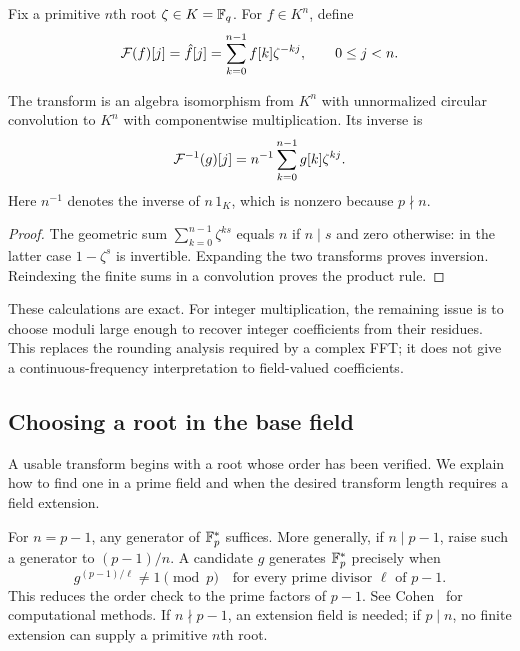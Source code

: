 \begin{defn}
Fix a primitive $n$th root $\zeta\in K=\mathbb{F}_q$. For $f\in K^n$, define
\begin{equation}
\label{eq-defn-transforme-fp}
 \mathcal{F}(f)[j]=\hat{f}[j]=\sum_{k=0}^{n-1}f[k]\zeta^{-kj},\qquad 0\leq j<n.
\end{equation}
\end{defn}


\begin{prop}
\label{prop-prtes-tfd-finite-field}
The transform is an algebra isomorphism from $K^n$ with unnormalized
circular convolution to $K^n$ with componentwise multiplication. Its
inverse is
\begin{equation}
\label{eq-defn-tfd-finite-field}
 \mathcal{F}^{-1}(g)[j]=n^{-1}\sum_{k=0}^{n-1}g[k]\zeta^{kj}.
\end{equation}
Here $n^{-1}$ denotes the inverse of $n\,1_K$, which is nonzero because
$p\nmid n$.
\end{prop}
\begin{proof}
The geometric sum $\sum_{k=0}^{n-1}\zeta^{ks}$ equals $n$ if $n\mid s$
and zero otherwise: in the latter case $1-\zeta^s$ is invertible.
Expanding the two transforms proves inversion. Reindexing the finite sums
in a convolution proves the product rule.
\end{proof}
These calculations are exact. For integer multiplication, the remaining
issue is to choose moduli large enough to recover integer coefficients
from their residues. This replaces the rounding analysis required by a
complex FFT; it does not give a continuous-frequency interpretation to
field-valued coefficients.

\subsection{Choosing a root in the base field}
\label{sect2-a-particular-case}

A usable transform begins with a root whose order has been verified. We
explain how to find one in a prime field and when the desired transform
length requires a field extension.

For $n=p-1$, any generator of $\mathbb{F}_p^*$ suffices. More generally, if
$n\mid p-1$, raise such a generator to $(p-1)/n$. A candidate $g$ generates
$\mathbb{F}_p^*$ precisely when
\[
 g^{(p-1)/\ell}\ne1\pmod p
 \quad\text{for every prime divisor $\ell$ of $p-1$}.
\]
This reduces the order check to the prime factors of $p-1$.
See Cohen~\cite{cohen-computational} for computational methods.
If $n\nmid p-1$, an extension field is needed; if $p\mid n$, no finite
extension can supply a primitive $n$th root.

